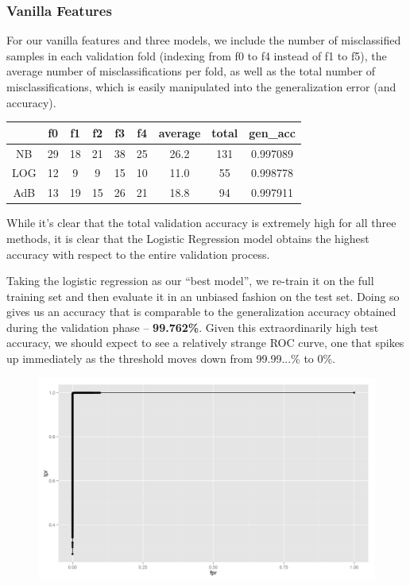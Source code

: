 \documentclass{article} %
\begin{document}
\subsubsection{Vanilla Features}
For our vanilla features and three models, we include the number of misclassified samples in each validation fold (indexing from f0 to f4 instead of f1 to f5), the average number of misclassifications per fold, as well as the total number of misclassifications, which is easily manipulated into the generalization error (and accuracy).
\begin{table}[h]
\centering
\large
\begin{tabular}{|c|c|c|c|c|c|c|c|c|}
\hline
    & f0 & f1 & f2 & f3 & f4 & average & total & gen\_acc \\ \hline
NB  & 29 & 18 & 21 & 38 & 25 & 26.2    & 131   & 0.997089 \\ \hline
LOG & 12 & 9  & 9  & 15 & 10 & 11.0    & 55    & 0.998778 \\ \hline
AdB & 13 & 19 & 15 & 26 & 21 & 18.8    & 94    & 0.997911 \\ \hline
\end{tabular}
\end{table}
While it's clear that the total validation accuracy is extremely high for all three methods, it is clear that the Logistic Regression model obtains the highest accuracy with respect to the entire validation process.\par 
Taking the logistic regression as our ``best model'', we re-train it on the full training set and then evaluate it in an unbiased fashion on the test set.  Doing so gives us an accuracy that is comparable to the generalization accuracy obtained during the validation phase -- \textbf{99.762\%}.  Given this extraordinarily high test accuracy, we should expect to see a relatively strange ROC curve, one that spikes up immediately as the threshold moves down from 99.99...\% to 0\%.
\begin{figure}[h]
\centering
\includegraphics[width=140mm]{roc_vanilla.png}
\end{figure}
\end{document}

